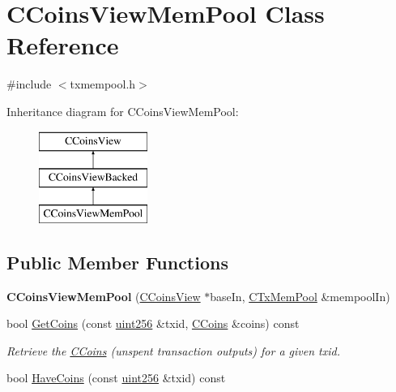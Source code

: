\hypertarget{class_c_coins_view_mem_pool}{}\section{C\+Coins\+View\+Mem\+Pool Class Reference}
\label{class_c_coins_view_mem_pool}


{\ttfamily \#include $<$txmempool.\+h$>$}

Inheritance diagram for C\+Coins\+View\+Mem\+Pool\+:\begin{figure}[H]
\begin{center}
\leavevmode
\includegraphics[height=3.000000cm]{class_c_coins_view_mem_pool}
\end{center}
\end{figure}
\subsection*{Public Member Functions}
\begin{DoxyCompactItemize}
\item 
\mbox{\label{class_c_coins_view_mem_pool_aab9a206c304acec322fddf646c7bafb9}} 
{\bfseries C\+Coins\+View\+Mem\+Pool} (\mbox{\hyperlink{class_c_coins_view}{C\+Coins\+View}} $\ast$base\+In, \mbox{\hyperlink{class_c_tx_mem_pool}{C\+Tx\+Mem\+Pool}} \&mempool\+In)
\item 
\mbox{\label{class_c_coins_view_mem_pool_a1a4a556821b1680ff4b73758c8a1e471}} 
bool \mbox{\hyperlink{class_c_coins_view_mem_pool_a1a4a556821b1680ff4b73758c8a1e471}{Get\+Coins}} (const \mbox{\hyperlink{classuint256}{uint256}} \&txid, \mbox{\hyperlink{class_c_coins}{C\+Coins}} \&coins) const
\begin{DoxyCompactList}\small\item\em Retrieve the \mbox{\hyperlink{class_c_coins}{C\+Coins}} (unspent transaction outputs) for a given txid. \end{DoxyCompactList}\item 
bool \mbox{\hyperlink{class_c_coins_view_mem_pool_a2c5900448dc5570053060686ad1f014b}{Have\+Coins}} (const \mbox{\hyperlink{classuint256}{uint256}} \&txid) const
\end{DoxyCompactItemize}
